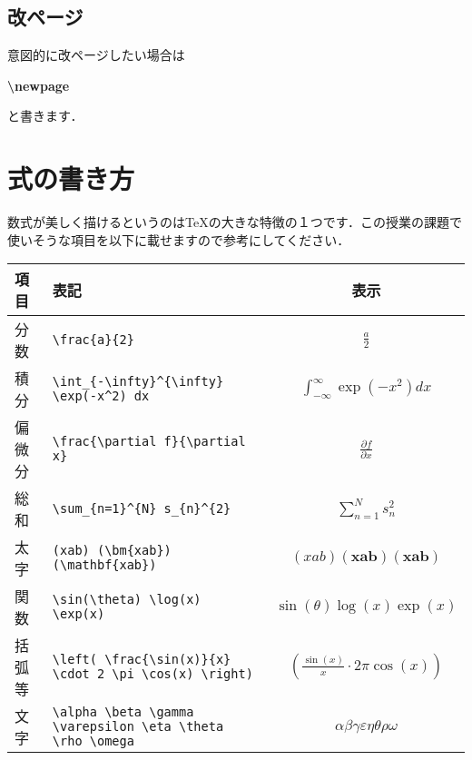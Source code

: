 \documentclass[12pt,a4j,dvipdfmx]{jarticle}
\begin{document}
\subsection{改ページ}
意図的に改ページしたい場合は

{\bf \textbackslash newpage}

と書きます．

\newpage
\section{式の書き方}
数式が美しく描けるというのは\TeX の大きな特徴の１つです．この授業の課題で使いそうな項目を以下に載せますので参考にしてください．

\begin{table}[h]
\begingroup
\renewcommand{\arraystretch}{2.0}
\begin{tabular}{l|l|c}
  \hline
  項目 & 表記 & 表示 \\
  \hline
  \hline
  分数 & \verb|\frac{a}{2}| & $\displaystyle \frac{a}{2}$  \\
  \hline
  積分 & \verb|\int_{-\infty}^{\infty} \exp(-x^2) dx| & $\displaystyle \int_{-\infty}^{\infty} \exp(-x^2) dx $ \\
  \hline
  偏微分 & \verb|\frac{\partial f}{\partial x}| & $\displaystyle \frac{\partial f}{\partial x} $ \\
  \hline
  総和 & \verb|\sum_{n=1}^{N} s_{n}^{2}| & $\displaystyle \sum_{n=1}^{N} s_{n}^{2} $ \\
  \hline
  太字& \verb|(xab) (\bm{xab}) (\mathbf{xab})| & $(xab) (\bm{xab}) (\mathbf{xab})$ \\
  \hline
  関数& \verb|\sin(\theta) \log(x) \exp(x)| & $\sin(\theta) \log(x) \exp(x)$ \\
  \hline
  括弧等& \verb|\left( \frac{\sin(x)}{x} \cdot 2 \pi \cos(x) \right)| & $\displaystyle \left( \frac{\sin(x)}{x} \cdot 2 \pi \cos(x) \right) $ \\
  \hline
  文字& \verb|\alpha \beta \gamma \varepsilon \eta \theta \rho \omega| & $\alpha \beta \gamma \varepsilon \eta \theta \rho \omega$ \\
  \hline
\end{tabular}
\endgroup
\end{table}
\end{document}
